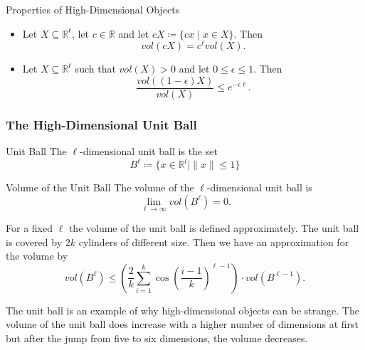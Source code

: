 \documentclass[english]{panikzettel}
\begin{document}
\begin{theo}{Properties of High-Dimensional Objects}
	\begin{itemize}[leftmargin=*]
		\item Let $X\subseteq \mathbb{R}^\ell$, let $c\in\mathbb{R}$ and let $cX\coloneqq \{cx\mid x\in X \}$. Then
		\vspace{-0.5\baselineskip}
		\[
		vol(cX)=c^\ell vol(X).
		\]
		\item Let $X\subseteq \mathbb{R}^\ell$ such that $vol(X)>0$ and let $0\leq \epsilon\leq 1$. Then
		\vspace{-0.5\baselineskip}
		\[
		\frac{vol((1-\epsilon)X)}{vol(X)}\leq e^{-\epsilon\ell}.
		\]
	\end{itemize}
\end{theo}


\subsubsection{The High-Dimensional Unit Ball}
\begin{halfboxl}
\vspace{-\baselineskip}
	\begin{defi}{Unit Ball}
	The $\ell$-dimensional unit ball is the set
	\[
	B^\ell \coloneqq \{x\in\mathbb{R}^l \mid \parallel x \parallel \leq 1 \}
	\]
	\end{defi}
\end{halfboxl}
\begin{halfboxr}
	\vspace{-\baselineskip}
	\begin{theo}{Volume of the Unit Ball}
	The volume of the $\ell$-dimensional unit ball is
	\[
	\lim_{\ell \to \infty} vol(B^\ell) = 0.
	\]
	\end{theo}
\end{halfboxr}

For a fixed $\ell$ the volume of the unit ball is defined approximately. The unit ball is covered by $2k$ cylinders of different size. Then we have an approximation for the volume by
\[
vol(B^\ell) \leq \left(\frac{2}{k} \sum_{i=1}^k \cos \left( \frac{i-1}{k}\right)^{\ell-1} \right)\cdot vol(B^{\ell-1}).
\]

The unit ball is an example of why high-dimensional objects can be strange. The volume of the unit ball does increase with a higher number of dimensions at first but after the jump from five to six dimensions, the volume decreases.
\end{document}
